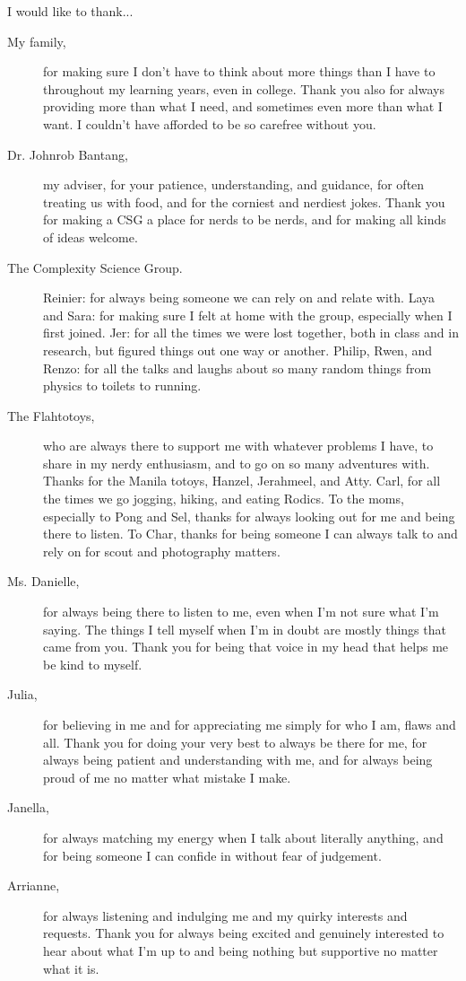 I would like to thank...
\begin{description}
    \item[My family,] for making sure I don't have to think about more things than I have to throughout my learning years, even in college. Thank you also for always providing more than what I need, and sometimes even more than what I want. I couldn't have afforded to be so carefree without you.
    \item[Dr. Johnrob Bantang,] my adviser, for your patience, understanding, and guidance, for often treating us with food, and for the corniest and nerdiest jokes. Thank you for making a CSG a place for nerds to be nerds, and for making all kinds of ideas welcome.
    \item[The Complexity Science Group.] Reinier: for always being someone we can rely on and relate with. Laya and Sara: for making sure I felt at home with the group, especially when I first joined. Jer: for all the times we were lost together, both in class and in research, but figured things out one way or another. Philip, Rwen, and Renzo: for all the talks and laughs about so many random things from physics to toilets to running.
    \item[The Flahtotoys,] who are always there to support me with whatever problems I have, to share in my nerdy enthusiasm, and to go on so many adventures with. Thanks for the Manila totoys, Hanzel, Jerahmeel, and Atty. Carl, for all the times we go jogging, hiking, and eating Rodics. To the moms, especially to Pong and Sel, thanks for always looking out for me and being there to listen. To Char, thanks for being someone I can always talk to and rely on for scout and photography matters.
    \item[Ms. Danielle,] for always being there to listen to me, even when I'm not sure what I'm saying. The things I tell myself when I'm in doubt are mostly things that came from you. Thank you for being that voice in my head that helps me be kind to myself.
    \item[Julia,] for believing in me and for appreciating me simply for who I am, flaws and all. Thank you for doing your very best to always be there for me, for always being patient and understanding with me, and for always being proud of me no matter what mistake I make.
    \item[Janella,] for always matching my energy when I talk about literally anything, and for being someone I can confide in without fear of judgement.
    \item[Arrianne,] for always listening and indulging me and my quirky interests and requests. Thank you for always being excited and genuinely interested to hear about what I'm up to and being nothing but supportive no matter what it is.

\end{description}
